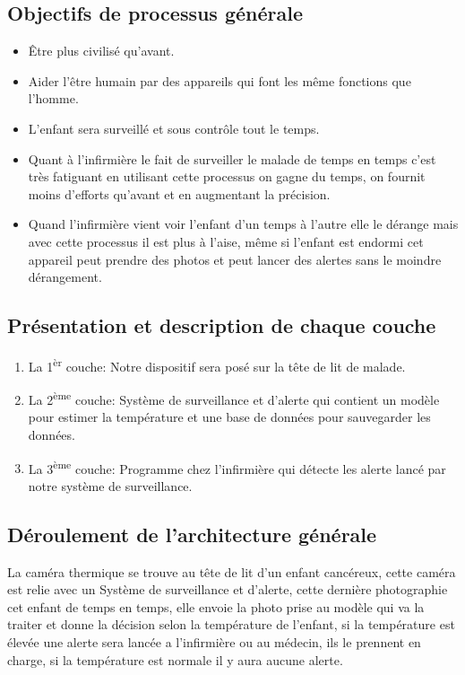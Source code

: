\documentclass[12pt]{article}
\begin{document}
\subsection{Objectifs de processus générale}
\begin{itemize}
	\item Être plus civilisé qu’avant.
	\item Aider l’être humain par des appareils qui font les même fonctions que l’homme.
	\item L’enfant sera surveillé et sous contrôle tout le temps.
	\item Quant à l'infirmière le fait de surveiller le malade de temps en temps c'est très fatiguant en utilisant cette processus on gagne du temps, on fournit moins d'efforts qu'avant et en augmentant la précision.	
	\item Quand l'infirmière vient voir l'enfant d'un temps à l'autre elle le dérange mais avec cette processus il est plus à l'aise, même si l'enfant est endormi cet appareil peut prendre des photos et peut lancer des alertes sans le moindre dérangement.
\end{itemize}

\subsection{Présentation et description de chaque couche}
\begin{enumerate}
		\item La 1\textsuperscript{èr} couche: Notre dispositif sera posé sur la tête de lit de malade. 
		\item La 2\textsuperscript{ème} couche: Système de surveillance et d'alerte qui contient  un modèle pour estimer la température et une base de données pour sauvegarder les données.
		\item La 3\textsuperscript{ème} couche: Programme chez l'infirmière qui détecte les alerte lancé par notre système de surveillance.
\end{enumerate}

\subsection{Déroulement de l'architecture générale}
La caméra thermique se trouve au tête de lit d'un enfant cancéreux, cette caméra est relie avec un Système de surveillance et d'alerte, cette dernière photographie cet enfant de temps en temps, elle envoie la photo prise au modèle qui va la traiter et donne la décision selon la température de l'enfant, si la température est élevée une alerte sera lancée a l'infirmière ou au médecin, ils le prennent en charge, si la température est normale il y aura aucune alerte.
\end{document}
